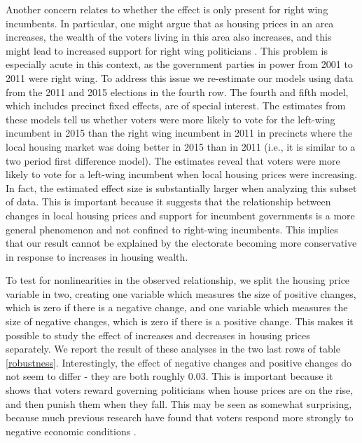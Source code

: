 \documentclass[12pt,a4paper]{article}
\begin{document}
	Another concern relates to whether the effect is only present for right wing incumbents. In particular, one might argue that as housing prices in an area increases, the wealth of the voters living in this area also increases, and this might lead to increased support for right wing politicians \cite{ansell2014political}. This problem is especially acute in this context, as the government parties in power from 2001 to 2011 were right wing. To address this issue we re-estimate our models using data from the 2011 and 2015 elections in the fourth row. The fourth and fifth model, which includes precinct fixed effects, are of special interest. The estimates from these models tell us whether voters were more likely to vote for the left-wing incumbent in 2015 than the right wing incumbent in 2011 in precincts where the local housing market was doing better in 2015 than in 2011 (i.e., it is similar to a two period first difference model). The estimates reveal that voters were more likely to vote for a left-wing incumbent when local housing prices were increasing. In fact, the estimated effect size is substantially larger when analyzing this subset of data. This is important because it suggests that the relationship between changes in local housing prices and support for incumbent governments is a more general phenomenon and not confined to right-wing incumbents. This implies that our result cannot be explained by the electorate becoming more conservative in response to increases in housing wealth.
	
	To test for nonlinearities in the observed relationship, we split the housing price variable in two, creating one variable which measures the size of positive changes, which is zero if there is a negative change, and one variable which measures the size of negative changes, which is zero if there is a positive change. This makes it possible to study the effect of increases and decreases in housing prices separately. We report the result of these analyses in the two last rows of table \ref{robustness}. Interestingly, the effect of negative changes and positive changes do not seem to differ - they are both roughly 0.03. This is important because it shows that voters reward governing politicians when house prices are on the rise, and then punish them when they fall. This may be seen as somewhat surprising, because much previous research have found that voters respond more strongly to negative economic conditions \citep[e.g.][]{bloom1975voter,headrick1991attention,soroka2014negativity}.
	
\end{document}
